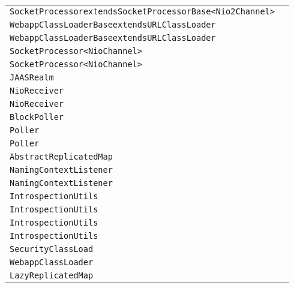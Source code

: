 \begin{center}
\begin{tabular}{ll}
\lstinline/SocketProcessorextendsSocketProcessorBase<Nio2Channel>/&\raisebox{0pt}{\lstinline/ doRun()/}\\ 
\lstinline/WebappClassLoaderBaseextendsURLClassLoader/&\raisebox{0pt}{\lstinline/ findClassInternal(String)/}\\ 
\lstinline/WebappClassLoaderBaseextendsURLClassLoader/&\raisebox{0pt}{\lstinline/ findClassInternal(String)/}\\ 
\lstinline/SocketProcessor<NioChannel>/&\raisebox{0pt}{\lstinline/ doRun()/}\\ 
\lstinline/SocketProcessor<NioChannel>/&\raisebox{0pt}{\lstinline/ doRun()/}\\ 
\lstinline/JAASRealm/&\raisebox{0pt}{\lstinline/ authenticate(Stringu)/}\\ 
\lstinline/NioReceiver/&\raisebox{0pt}{\lstinline/ run()/}\\ 
\lstinline/NioReceiver/&\raisebox{0pt}{\lstinline/ run()/}\\ 
\lstinline/BlockPoller/&\raisebox{0pt}{\lstinline/ run()/}\\ 
\lstinline/Poller/&\raisebox{0pt}{\lstinline/ timeout(int,boolean)/}\\ 
\lstinline/Poller/&\raisebox{0pt}{\lstinline/ timeout(int,boolean)/}\\ 
\lstinline/AbstractReplicatedMap/&\raisebox{0pt}{\lstinline/ Vput()/}\\ 
\lstinline/NamingContextListener/&\raisebox{0pt}{\lstinline/ removeResourceLink(String)/}\\ 
\lstinline/NamingContextListener/&\raisebox{0pt}{\lstinline/ removeResourceLink(String)/}\\ 
\lstinline/IntrospectionUtils/&\raisebox{0pt}{\lstinline/ ObjectgetProperty(Object,String)/}\\ 
\lstinline/IntrospectionUtils/&\raisebox{0pt}{\lstinline/ ObjectgetProperty(Object,String)/}\\ 
\lstinline/IntrospectionUtils/&\raisebox{0pt}{\lstinline/ ObjectgetProperty(Object,String)/}\\ 
\lstinline/IntrospectionUtils/&\raisebox{0pt}{\lstinline/ ObjectgetProperty(Object,String)/}\\ 
\lstinline/SecurityClassLoad/&\raisebox{0pt}{\lstinline/ securityClassLoad(ClassLoader)/}\\ 
\lstinline/WebappClassLoader/&\raisebox{0pt}{\lstinline/publishEntryInfo(Object)/}\\ 
\lstinline/LazyReplicatedMap/&\raisebox{0pt}{\lstinline/publishEntryInfo(Object)/}\\ 

\end{tabular}
\end{center}
